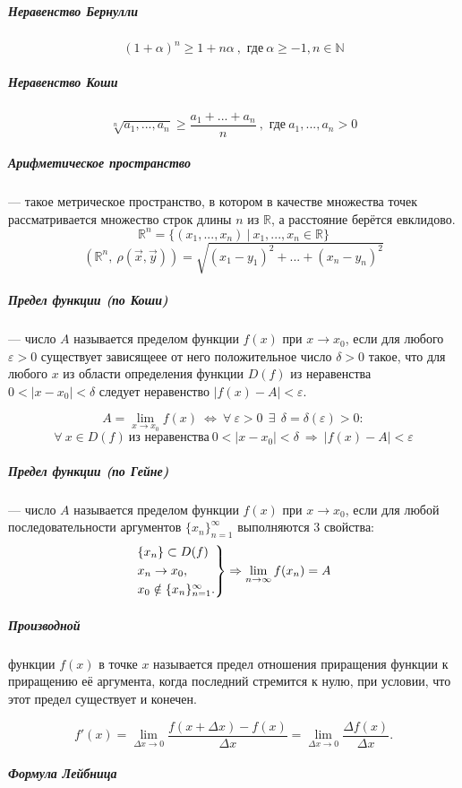 \documentclass[12pt, a4]{article}
\begin{document}
\subparagraph{Неравенство Бернулли}
\[ (1+\alpha)^{n} \geqslant 1+n\alpha \ ,\textrm{ где} \ \alpha\geqslant-1, n \in \mathbb{N} \]

\subparagraph{Неравенство Коши}
\[ \sqrt[n]{a_1, ..., a_n} \geqslant \frac{a_1+...+a_n}{n} \ ,\textrm{ где}  \ a_1, ..., a_n>0\]

\subparagraph{Арифметическое пространство} --- такое метрическое пространство, в котором в качестве множества точек рассматривается множество строк длины $n$ из $\mathbb{R}$, а расстояние берётся евклидово.
\[ \mathbb{R}^{n} = \{(x_1, ..., x_n) \ | \ x_1, ..., x_n \in \mathbb{R} \} \]
\[ (\mathbb{R}^{n}, \ \rho(\vec{x}, \vec{y})) = \sqrt{(x_1-y_1)^2+...+(x_n-y_n)^2} \]

\subparagraph{Предел функции (по Коши)} --- число $A$ называется пределом функции $f(x)$ при $x\rightarrow x_0$, если для любого $\varepsilon>0$ существует зависящеее от него положительное число $\delta>0$ такое, что для любого $x$ из области определения функции $D(f)$ из неравенства $0<|x-x_0|<\delta$ следует неравенство $|f(x)-A|<\varepsilon$.

\[ A = \lim_{x\to x_0} f(x) \ \Leftrightarrow \ \forall \ \varepsilon>0 \ \ \exists \ \ \delta=\delta(\varepsilon)>0: \]
\[\forall \ x\in D(f) \ \textrm{из неравенства} \ 0<|x-x_0|<\delta \ \Rightarrow \ |f(x)-A|<\varepsilon \]

\subparagraph{Предел функции (по Гейне)} --- число $A$ называется пределом функции $f(x)$ при $x\rightarrow x_0$, если для любой последовательности аргументов $\{x_n\}^{\infty} _{n=1}$ выполняются 3 свойства:
\begin{equation*}
	\begin{rcases}
		\{x_n\}\subset D(f)
		\\
		x_n\rightarrow x_0,
		\\
		x_0 \notin \{x_n\}^{\infty} _{n=1}.
	\end{rcases}
	\Rightarrow
	\lim_{n\to \infty} f(x_n) = A 
\end{equation*}

\subparagraph{Производной} функции $f(x)$ в точке $x$ называется предел отношения приращения функции к приращению её аргумента, когда последний стремится к нулю, при условии, что этот предел существует и конечен.

\[ f'(x) = \lim_{\Delta x \to 0} \frac{f(x+\Delta x)-f(x)}{\Delta x} = \lim\limits_{{\Delta x}\to 0} \frac{\Delta{f(x)}}{\Delta x}. \]

\subparagraph{Формула Лейбница}
\end{document}
